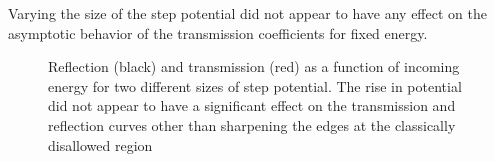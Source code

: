 \documentclass[singlepage,notitlepage,nofootinbib,11pt]{revtex4-1}
\begin{document}
Varying the size of the step potential did not appear to have any effect on the asymptotic behavior of the transmission coefficients for fixed energy.
\begin{figure}[h]
  \centering
  \captionsetup[subfigure]{labelformat=empty}
  \caption{\label{EoverV} Reflection (black) and transmission (red) as a function of incoming energy for two different sizes of step potential. The rise in potential did not appear to have a significant effect on the transmission and reflection curves other than sharpening the edges at the classically disallowed region}
\end{figure}
\end{document}
